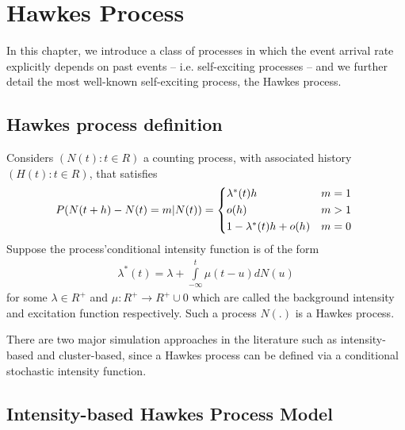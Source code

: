 \chapter{Hawkes Process}
In this chapter, we introduce a class of processes in which the event arrival rate explicitly depends on past events – i.e. self-exciting processes – and we further detail the most well-known self-exciting process, the Hawkes process.
\section{Hawkes process definition}
\begin{Definition}{}	
	Considers $(N(t): t\in R)$ a counting process, with associated history $(H(t):
	t \in R)$, that satisfies
	\begin{align*}
	P(N(t + h) - N(t) = m \rvert N(t)) = 
	\begin{cases*}
	\lambda^{*}(t)h & $m = 1$ \\
	o(h) & $m > 1$  \\
	1-\lambda^{*}(t)h + o(h) & $ m = 0$  
	\end{cases*}  
	\end{align*}
Suppose the process’conditional intensity function is of the form
	\begin{align*}
	\lambda^{*}(t) = \lambda + \displaystyle\int\limits_{-\infty}^{t} \mu(t-u)dN(u) 
	\end{align*}
for some $\lambda \in R^{+}$ and $\mu: R^{+} \rightarrow R^{+} \cup {0}$ which are called the background intensity and excitation function respectively. Such a process $N(.)$ is a Hawkes process.
\end{Definition}

There are two major simulation approaches in the literature such as intensity-based and cluster-based, since a Hawkes process can be defined via a conditional stochastic intensity function.

\section{Intensity-based Hawkes Process Model}

